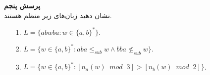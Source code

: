 \textbf{پرسش پنجم}\\[0.1in]
نشان دهید زبان‌های زیر منظم هستند.
\begin{enumerate}
    \item[1.] $L = \{ abwba : w \in \{ a, b \}^*\}$.
    \item [2.]
    $L = \{w \in \{ a, b \}^* : aba \leq_{sub} w \wedge 
    bba \nleq_{sub} w \} $.
    \item[3.]
    $L = \{w \in \{ a, b \}^* : [n_a(w)\;\; mod\;\; 3] > [n_b(w) \;\;mod\;\; 2]\}$.
\end{enumerate}
